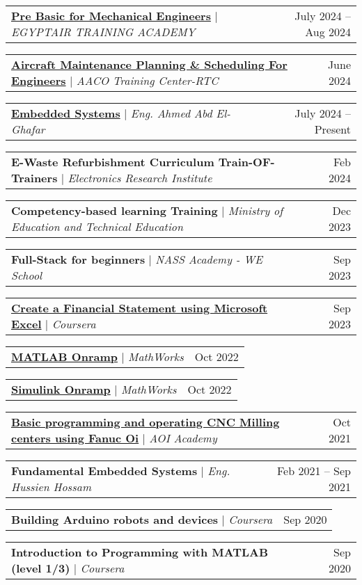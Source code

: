\documentclass[letterpaper,11pt]{article}
\makeatletter
\newcommand{\resumeProjectHeading}[2]{
    \item
    \begin{tabular*}{0.97\textwidth}{l@{\extracolsep{\fill}}r}
      \small#1 & #2 \\
    \end{tabular*}\vspace{-7pt}
}
\makeatother
\begin{document}
    \resumeProjectHeading
      {\textbf{\href{https://training.egyptair.com/CRM/Catalog/42400}{Pre Basic for Mechanical Engineers}} $|$ \emph{EGYPTAIR TRAINING ACADEMY}}{July 2024 -- Aug 2024}

    \resumeProjectHeading
      {\textbf{\href{https://training.egyptair.com/CRM/Catalog/55200}{Aircraft Maintenance Planning \& Scheduling For Engineers}} $|$ \emph{AACO Training Center-RTC}}{June 2024}
    
    \resumeProjectHeading
      {\textbf{\href{https://docs.google.com/document/d/1X7FlRX-Re-GHMI3wuXc9e37jJEGl_DlxNb-6NCMlmgo/edit?usp=sharing}{Embedded Systems}} $|$ \emph{Eng. Ahmed Abd El-Ghafar}}{July 2024 -- Present}
    
    \resumeProjectHeading
      {\textbf{E-Waste Refurbishment Curriculum Train-OF-Trainers} $|$ \emph{Electronics Research Institute}}{Feb 2024}

    \resumeProjectHeading
      {\textbf{Competency-based learning Training} $|$ \emph{Ministry of Education and Technical Education}}{Dec 2023}

    \resumeProjectHeading
      {\textbf{Full-Stack for beginners} $|$ \emph{NASS Academy - WE School}}{Sep 2023}
    
    \resumeProjectHeading
      {\textbf{\href{https://www.coursera.org/projects/create-financial-statement-using-microsoft-excel}{Create a Financial Statement using Microsoft Excel}} $|$ \emph{Coursera}}{Sep 2023}

    \resumeProjectHeading
      {\textbf{\href{https://matlabacademy.mathworks.com/details/matlab-onramp/gettingstarted}{MATLAB Onramp}} $|$ \emph{MathWorks}}{Oct 2022}
    
    \resumeProjectHeading
      {\textbf{\href{https://matlabacademy.mathworks.com/details/simulink-onramp/simulink}{Simulink Onramp}} $|$ \emph{MathWorks}}{Oct 2022}

    \resumeProjectHeading
      {\textbf{\href{https://drive.google.com/drive/folders/1gKIz-PYpO2zrjnvkzoYVhijYoGJP7P9j?usp=sharing}{Basic programming and operating CNC Milling centers using Fanuc Oi}} $|$ \emph{AOI Academy}}{Oct 2021}

    \resumeProjectHeading
      {\textbf{Fundamental Embedded Systems} $|$ \emph{Eng. Hussien Hossam}}{Feb 2021 -- Sep 2021}
  
    \resumeProjectHeading
      {\textbf{Building Arduino robots and devices} $|$ \emph{Coursera}}{Sep 2020}
      
    \resumeProjectHeading
      {\textbf{Introduction to Programming with MATLAB (level 1/3)} $|$ \emph{Coursera}}{Sep 2020}
    
\end{document}
